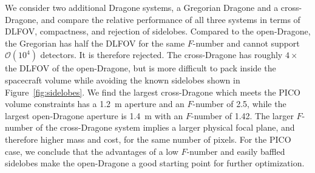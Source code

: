 \documentclass[]{spie}  %
\newcommand{\comr}[1]{\textcolor{red}{#1}}
\newcommand{\como}[1]{\textcolor{orange}{#1}}
\begin{document}
We consider two additional Dragone systems, a Gregorian Dragone and a cross-Dragone, and compare the 
relative performance of all three systems in terms of DLFOV, compactness, and rejection of sidelobes.  
Compared to the open-Dragone, the Gregorian has half the DLFOV for the same $F$-number and cannot  
support $\mathcal{O}(10^4)$ detectors. It is therefore rejected.  
The cross-Dragone has roughly $4\times$ the DLFOV of the open-Dragone, 
but is more difficult to pack inside the spacecraft volume while avoiding the known sidelobes shown in Figure~\ref{fig:sidelobes}.
We find the largest cross-Dragone which meets the PICO volume constraints has 
a 1.2~m aperture and an $F$-number of 2.5, while the largest open-Dragone aperture is 1.4~m with an $F$-number of 1.42. The larger 
$F$-number of the cross-Dragone system implies a larger physical focal plane, and therefore higher mass and cost, 
for the same number of pixels. 
For the PICO case, we conclude that the advantages of a low $F$-number and easily baffled sidelobes make the open-Dragone a good starting  
point for further optimization. 


\end{document}
